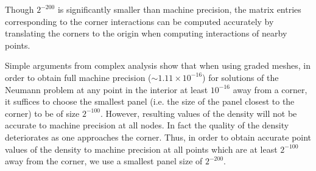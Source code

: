 \begin{remark}
Though $2^{-200}$ is significantly smaller than machine precision, the matrix entries corresponding to the
corner interactions can be computed accurately by translating the corners to the origin when 
computing interactions of nearby points.
\end{remark} 
\begin{remark}
Simple arguments from complex analysis show that when using graded meshes, in order to obtain full 
machine precision 
($\sim 1.11 \times 10^{-16}$) for solutions of the Neumann problem at any point in the interior 
at least $10^{-16}$ away from a corner, it suffices to choose the smallest panel (i.e. the size of the 
panel closest to the corner) to be of size $2^{-100}.$ However, resulting values of the density will not be 
accurate to machine precision at all nodes. In fact the quality
of the density deteriorates as one approaches the corner. Thus, in order to obtain accurate point values
of the density to machine precision at all points which are at least $2^{-100}$ away from the corner, we use a smallest
panel size of $2^{-200}$. 
\end{remark}



